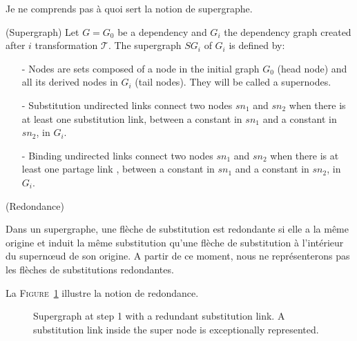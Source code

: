 \todo Je ne comprends pas à quoi sert la notion de supergraphe.

\begin{mydef} (Supergraph)
Let $G=G_0$ be a dependency and $G_i$ the dependency graph created after $i$ transformation $\mathcal{T}$. The supergraph $SG_i$ of $G_i$ is defined by:
\begin{enumerate}
  \item [-] Nodes are sets composed of a node in the initial graph $G_0$ (head node) and all its derived nodes in $G_i$ (tail nodes). They will be called a supernodes.
  \item [-] {\color{blue}Substitution} undirected links connect two nodes $sn_1$ and $sn_2$ when there is at least one  {\color{blue}substitution} link, between a constant in $sn_1$ and a constant in $sn_2$, in $G_i$.
  \item [-] {\color{green}Binding} undirected links connect two nodes $sn_1$ and $sn_2$ when there is at least one {\color{green}partage} link , between a constant in $sn_1$ and a constant in $sn_2$, in $G_i$.
\end{enumerate}
\end{mydef}




\begin{mydef} (Redondance)

Dans un supergraphe, une flèche de substitution est redondante si elle a la m\^eme origine et induit la m\^eme substitution qu'une flèche de substitution à l'intérieur du supernœud de son origine. A partir de ce moment, nous ne représenterons pas les flèches de substitutions redondantes.
\end{mydef}

La \textsc{Figure}~\ref{fig:redondance} illustre la notion de redondance.


\begin{figure}[h!]
\begin{center}
\end{center}
\caption{Supergraph at step 1 with a redundant substitution link. A
  substitution link inside the super node is exceptionally represented.}
\label{fig:redondance}
\end{figure}


